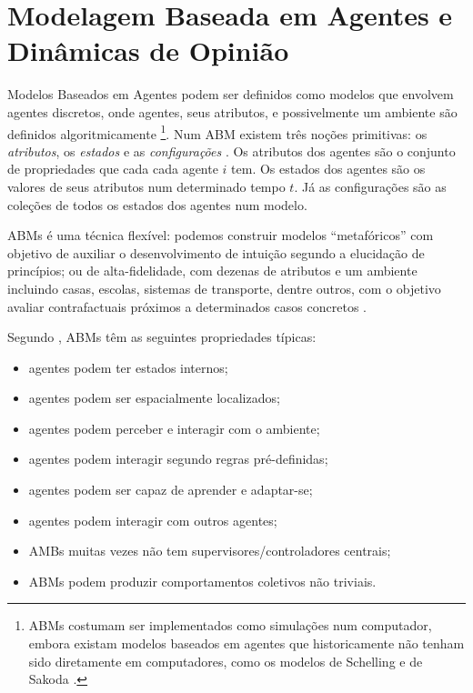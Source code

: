 \section{Modelagem Baseada em Agentes e Dinâmicas de Opinião}

Modelos Baseados em Agentes podem ser definidos como modelos que envolvem
agentes discretos, onde agentes, seus atributos, e possivelmente um ambiente são
definidos algoritmicamente \cite{sayama2015introduction} \footnote{ ABMs
  costumam ser implementados como simulações num computador, embora existam
  modelos baseados em agentes que historicamente não tenham sido diretamente em
  computadores, como os modelos de Schelling e de Sakoda
  \cite{hegselmann2017thomas}.}. Num ABM existem três noções primitivas: os
\textit{atributos}, os \textit{estados} e as \textit{configurações}
\cite[p.7]{de2014agent}. Os atributos dos agentes são o conjunto de propriedades
que cada cada agente \(i\) tem. Os estados dos agentes são os valores de seus
atributos num determinado tempo \(t\). Já as configurações são as coleções de
todos os estados dos agentes num modelo.

ABMs é uma técnica flexível: podemos construir modelos ``metafóricos'' com
objetivo de auxiliar o desenvolvimento de intuição segundo a elucidação de
princípios; ou de alta-fidelidade, com dezenas de atributos e um
ambiente incluindo casas, escolas, sistemas de transporte, dentre outros, com o
objetivo avaliar contrafactuais próximos a determinados casos concretos
\cite{de2014agent, epstein2006generative}.


Segundo , ABMs têm as seguintes
propriedades típicas:
\begin{itemize}
\item agentes podem ter estados internos;
\item agentes podem ser espacialmente localizados;
\item agentes podem perceber e interagir com o ambiente;
\item agentes podem interagir segundo regras pré-definidas;
\item agentes podem ser capaz de aprender e adaptar-se;
\item agentes podem interagir com outros agentes;
\item AMBs muitas vezes não tem supervisores/controladores centrais;
  \item ABMs podem produzir comportamentos coletivos não triviais.
  \end{itemize}

